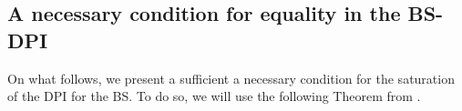 \begin{comment}
    \begin{equation}
        f(T(X))\leq T(f(X))
    \end{equation}
\end{theorem}
Since $f(x)=x^2$ is operator convex and $T=\frac{1}{d_C}\tr_C$ is positive and unital, then
\begin{equation}
    \tr_C[(\rho_B \# \rho_{BC})^2]\geq d_C\left[\frac{1}{d_C}\tr_C(\rho_B \# \rho_{BC}) \right]^2=\frac{1}{d_C}\rho_B^{\frac{1}{2}}\tr_C\left[\left(\rho_B^{-\frac{1}{2}}\rho_{BC}\rho_B^{-\frac{1}{2}}\right)^{\frac{1}{2}}\right]\rho_B\tr_C\left[\left(\rho_B^{-\frac{1}{2}}\rho_{BC}\rho_B^{-\frac{1}{2}}\right)^{\frac{1}{2}}\right]\rho_B^{\frac{1}{2}}
\end{equation}
Now, on the one hand, using the monotonic version of the previous theorem, $\tr_C\left[\left(\rho_B^{-\frac{1}{2}}\rho_{BC}\rho_B^{-\frac{1}{2}}\right)^{\frac{1}{2}}\right]\leq \1_B \sqrt{d_C}$, and the question is whether this quantity is lower bounded by $\1_B$ (for pure product states this lower bound works).
\end{comment}

\subsection{A necessary condition for equality in the BS-DPI}

On what follows, we present a sufficient a necessary condition for the saturation of the DPI for the BS. To do so, we will use the following Theorem from \cite{BluhmCapel-BSentropy-2019}.



